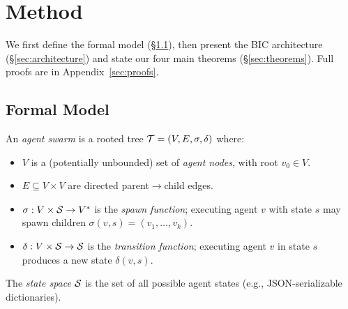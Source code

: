 
\section{Method}
\label{sec:method}

We first define the formal model (\S\ref{sec:formal}), then present
the BIC architecture (\S\ref{sec:architecture}) and state our four
main theorems (\S\ref{sec:theorems}).  Full proofs are in
Appendix~\ref{sec:proofs}.

\subsection{Formal Model}
\label{sec:formal}

\begin{definition}
\label{def:swarm}
An \emph{agent swarm} is a rooted tree $\mathcal{T} = (V, E, \sigma, \delta)$
where:
\begin{itemize}
  \item $V$ is a (potentially unbounded) set of \emph{agent nodes},
        with root $v_0 \in V$.
  \item $E \subseteq V \times V$ are directed parent$\to$child edges.
  \item $\sigma: V \times \mathcal{S} \to V^*$ is the \emph{spawn function};
        executing agent $v$ with state $s$ may spawn children
        $\sigma(v,s) = (v_1, \dots, v_k)$.
  \item $\delta: V \times \mathcal{S} \to \mathcal{S}$ is the \emph{transition
        function}; executing agent $v$ in state $s$ produces a new
        state $\delta(v, s)$.
\end{itemize}
The \emph{state space} $\mathcal{S}$ is the set of all possible agent
states (e.g., JSON-serializable dictionaries).
\end{definition}

